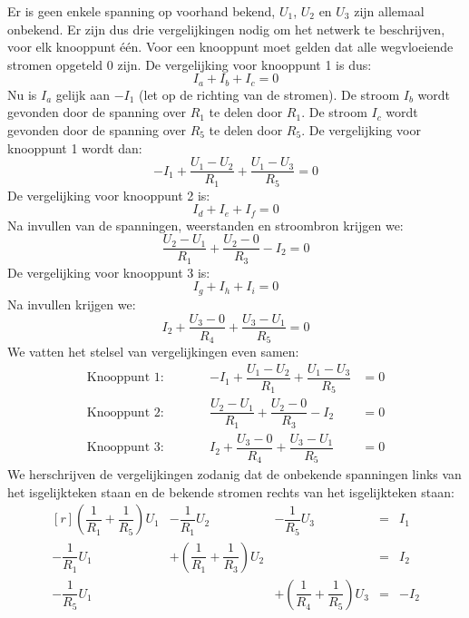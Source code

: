 Er is geen enkele spanning op voorhand bekend, $U_1$, $U_2$ en $U_3$ zijn allemaal onbekend. Er zijn dus drie vergelijkingen nodig om het netwerk te beschrijven, voor elk knooppunt één. Voor een knooppunt moet gelden dat alle wegvloeiende stromen opgeteld 0 zijn. De vergelijking voor knooppunt 1 is dus:
%
\begin{equation}
I_a + I_b + I_c = 0
\end{equation}
%
Nu is $I_a$ gelijk aan $-I_1$ (let op de richting van de stromen). De stroom $I_b$ wordt gevonden door de spanning over $R_1$ te delen door $R_1$. De stroom $I_c$ wordt gevonden door de spanning over $R_5$ te delen door $R_5$. De vergelijking voor knooppunt 1 wordt dan:
%
\begin{equation}
-I_1 + \dfrac{U_1-U_2}{R_1} + \dfrac{U_1-U_3}{R_5} = 0
\end{equation}
%
De vergelijking voor knooppunt 2 is:
%
\begin{equation}
I_d + I_e + I_f = 0
\end{equation}
%
Na invullen van de spanningen, weerstanden en stroombron krijgen we:
%
\begin{equation}
\dfrac{U_2-U_1}{R_1} + \dfrac{U_2-0}{R_3} - I_2 = 0
\end{equation}
%
De vergelijking voor knooppunt 3 is:
%
\begin{equation}
I_g + I_h + I_i= 0
\end{equation}
%
Na invullen krijgen we:
%
\begin{equation}
I_2 + \dfrac{U_3-0}{R_4} + \dfrac{U_3-U_1}{R_5} = 0
\end{equation}
%
We vatten het stelsel van vergelijkingen even samen:
%
\begin{equation}
\begin{split}
\text{Knooppunt 1:} & \qquad & -I_1 + \dfrac{U_1-U_2}{R_1} + \dfrac{U_1-U_3}{R_5} &= 0 \\
\text{Knooppunt 2:} &        & \dfrac{U_2-U_1}{R_1} + \dfrac{U_2-0}{R_3} - I_2 &= 0 \\
\text{Knooppunt 3:} &        & I_2 + \dfrac{U_3-0}{R_4} + \dfrac{U_3-U_1}{R_5} &= 0
\end{split}
\end{equation}
%
We herschrijven de vergelijkingen zodanig dat de onbekende spanningen links van het isgelijkteken staan en de bekende stromen rechts van het isgelijkteken staan:
%
\begin{equation}\label{equ:gellinsolve5}
\begin{matrix*}[r]
\left(\dfrac{1}{R_1}+\dfrac{1}{R_5}\right)U_1 & -\dfrac{1}{R_1}U_2 & -\dfrac{1}{R_5}U_3 &=& I_1 \\[1em]
-\dfrac{1}{R_1}U_1 & +\left(\dfrac{1}{R_1}+\dfrac{1}{R_3}\right)U_2 &  & = & I_2 \\[1em]
-\dfrac{1}{R_5}U_1 && +\left(\dfrac{1}{R_4}+\dfrac{1}{R_5}\right)U_3 & = &-I_2
\end{matrix*}
\end{equation}

